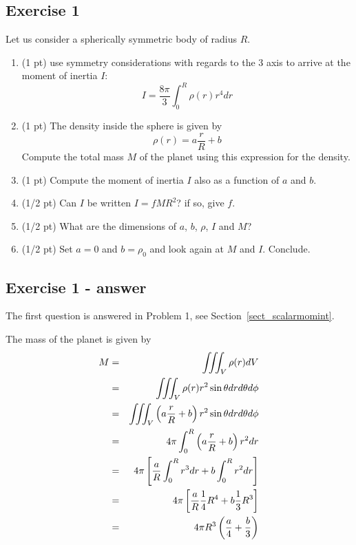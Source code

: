 
\subsection*{Exercise 1}


Let us consider a spherically symmetric body of radius $R$.

\begin{enumerate}
\item (1 pt) use symmetry considerations with regards to the 3 axis
to arrive at the moment of inertia $I$:
\begin{equation}
I=\frac{8\pi}{3} \int_0^R \rho(r) r^4 dr 
\end{equation}
\item (1 pt) The density inside the sphere is given by
\[
\rho(r)=a \frac{r}{R} +b
\]
Compute the total mass $M$ of the planet using this expression for the density.
\item (1 pt) Compute the moment of inertia $I$ also as a function of $a$ and $b$.
\item (1/2 pt) Can $I$ be written $I=fMR^2$? if so, give $f$.
\item (1/2 pt) What are the dimensions of $a$, $b$, $\rho$, $I$ and $M$?
\item (1/2 pt) Set $a=0$ and $b=\rho_0$ and look again at $M$ and $I$. Conclude.
\end{enumerate}

\subsection*{Exercise 1 - answer}

The first question is answered in Problem 1, see Section~\ref{sect_scalarmomint}.

The mass of the planet is given by
\begin{eqnarray}
M
&=& \iiint_V \rho(r) dV \nonumber\\
&=& \iiint_V \rho(r) r^2 \sin\theta dr d\theta d\phi \nonumber\\
&=& \iiint_V \left(a\frac{r}{R}+b\right) r^2 \sin\theta dr d\theta d\phi \nonumber\\
&=& 4\pi \int_0^R \left(a\frac{r}{R}+b\right) r^2 dr \nonumber\\
&=& 4\pi \left[ \frac{a}{R} \int_0^R r^3 dr +b\int_0^R  r^2 dr \right]\nonumber\\
&=& 4\pi \left[ \frac{a}{R} \frac14 R^4  + b\frac13 R^3 \right]\nonumber\\
&=& 4 \pi R^3 \left( \frac{a}{4} + \frac{b}{3} \right)
\end{eqnarray}


